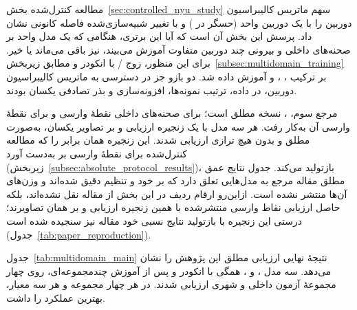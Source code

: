 مطالعه کنترل‌شده بخش~\ref{sec:controlled_nyu_study} سهم ماتریس کالیبراسیون دوربین را با یک دوربین واحد (حسگر  در ) و با تغییر شبیه‌سازی‌شده فاصله کانونی نشان داد. پرسش این بخش آن است که آیا این برتری، هنگامی که یک مدل واحد بر صحنه‌های داخلی و بیرونی چند دوربین متفاوت آموزش می‌بیند، نیز باقی می‌ماند یا خیر. برای این منظور، زوج \proposedmodel{}/\controlmodel{} با انکودر  و مطابق زیربخش~\ref{subsec:multidomain_training} بر ترکیب ، ،  و  آموزش داده شد. دو بازو جز در دسترسی به ماتریس کالیبراسیون دوربین، در داده، ترتیب نمونه‌ها، افزونه‌سازی و بذر تصادفی یکسان بودند.

مرجع سوم، \publishedbasemodel{}، نسخه مطلق  است؛ برای صحنه‌های داخلی نقطهٔ وارسی  و برای  نقطهٔ وارسی  آن به‌کار رفت. هر سه مدل با یک زنجیره ارزیابی و بر تصاویر یکسان، به‌صورت مطلق و بدون هیچ ترازی ارزیابی شدند. این زنجیره همان  برابر  را که مطالعه کنترل‌شده برای نقطهٔ وارسی  بر  به‌دست آورد (زیربخش~\ref{subsec:absolute_protocol_results})، بازتولید می‌کند. جدول نتایج عمق مطلق مقاله مرجع به مدل‌هایی تعلق دارد که بر خود  و  تنظیم دقیق شده‌اند و وزن‌های آن‌ها منتشر نشده است. ازاین‌رو ارقام ردیف \publishedbasemodel{} در این بخش از مقاله نقل نشده‌اند، بلکه حاصل ارزیابی نقاط وارسی منتشرشده با همین زنجیره ارزیابی و بر همان تصاویرند؛ درستی این زنجیره با بازتولید نتایج نسبی خود مقاله نیز سنجیده شده است (جدول~\ref{tab:paper_reproduction}).

جدول~\ref{tab:multidomain_main} نتیجهٔ نهایی ارزیابی مطلق این پژوهش را نشان می‌دهد. سه مدل \proposedmodel{}، \controlmodel{} و \publishedbasemodel{}، همگی با انکودر  و پس از آموزش چندمجموعه‌ای، روی چهار مجموعهٔ آزمون داخلی و شهری ارزیابی شدند. \proposedmodel{} در هر چهار مجموعه و هر سه معیار، بهترین عملکرد را داشت.

